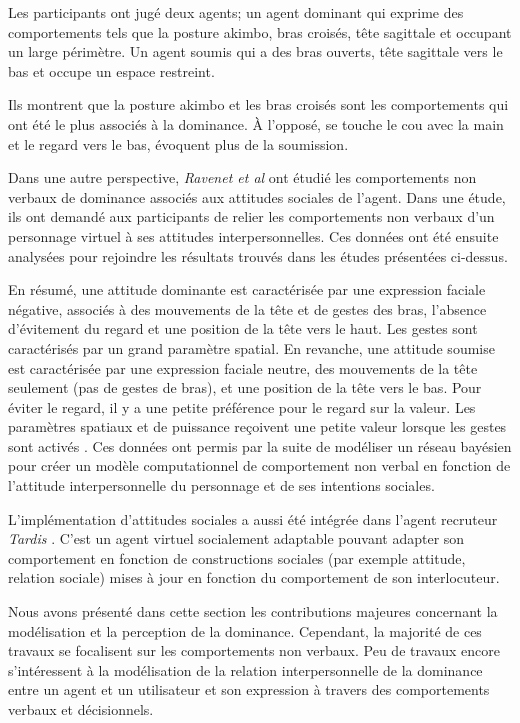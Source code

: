 	Les participants ont jugé deux agents;  un agent dominant qui exprime des comportements tels que la posture akimbo, bras croisés, tête sagittale et occupant un large périmètre. Un agent soumis qui a des bras ouverts, tête sagittale vers le bas et occupe un espace restreint.
	
	Ils montrent que la posture akimbo et les bras croisés sont les comportements qui ont été le plus associés à la dominance. À l'opposé, se touche le cou avec la main et le regard vers le bas, évoquent plus de la soumission. 
	
	Dans une autre perspective,  \emph{Ravenet et al} \cite{ravenet2013user} ont étudié les comportements non verbaux de dominance associés aux attitudes sociales de l'agent. Dans une étude, ils ont demandé aux participants de relier les comportements non verbaux d'un personnage virtuel à ses attitudes interpersonnelles. Ces données ont été ensuite analysées pour rejoindre les résultats trouvés dans les études présentées ci-dessus.  
	
	En résumé, une attitude dominante est caractérisée par une expression faciale négative, associés à des mouvements de la tête et de gestes des bras, l'absence d'évitement du regard et une position de la tête vers le haut. Les gestes sont caractérisés par un grand paramètre spatial. En revanche, une attitude soumise est caractérisée par une expression faciale neutre, des mouvements de la tête seulement (pas de gestes de bras), et une position de la tête vers le bas. Pour éviter le regard, il y a une petite préférence pour le regard sur la valeur. Les paramètres spatiaux et de puissance reçoivent une petite valeur lorsque les gestes sont activés \cite{ravenet2013user}. Ces données ont permis par la suite de   modéliser un réseau bayésien pour créer un modèle computationnel de comportement non verbal en fonction de l'attitude interpersonnelle du personnage et de ses intentions sociales.
	
	L'implémentation d'attitudes sociales a aussi été intégrée dans l'agent recruteur \emph{Tardis} \cite{youssef2015towards}. C'est un agent virtuel socialement adaptable pouvant adapter son comportement en fonction de constructions sociales (par exemple attitude, relation sociale) mises à jour en fonction du comportement de son interlocuteur. 
	
	Nous avons présenté dans cette section les contributions majeures concernant la modélisation et la perception de la dominance. Cependant, la majorité de ces travaux se focalisent sur les comportements non verbaux. Peu de travaux encore s'intéressent à la modélisation de la relation interpersonnelle de la dominance entre un agent et un utilisateur et son expression à travers des comportements verbaux et décisionnels. 
	
